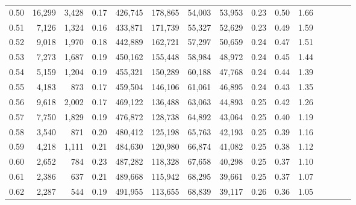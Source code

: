 \begin{tabular}{rrrcrrrrrrrrrrr}
0.50 &  16,299 &  3,428 &                                       0.17 &  426,745 &  178,865 &   54,003 &   53,953 &  0.23 &  0.50 &                         1.66 \\
0.51 &   7,126 &  1,324 &                                       0.16 &  433,871 &  171,739 &   55,327 &   52,629 &  0.23 &  0.49 &                         1.59 \\
0.52 &   9,018 &  1,970 &                                       0.18 &  442,889 &  162,721 &   57,297 &   50,659 &  0.24 &  0.47 &                         1.51 \\
0.53 &   7,273 &  1,687 &                                       0.19 &  450,162 &  155,448 &   58,984 &   48,972 &  0.24 &  0.45 &                         1.44 \\
0.54 &   5,159 &  1,204 &                                       0.19 &  455,321 &  150,289 &   60,188 &   47,768 &  0.24 &  0.44 &                         1.39 \\
0.55 &   4,183 &    873 &                                       0.17 &  459,504 &  146,106 &   61,061 &   46,895 &  0.24 &  0.43 &                         1.35 \\
0.56 &   9,618 &  2,002 &                                       0.17 &  469,122 &  136,488 &   63,063 &   44,893 &  0.25 &  0.42 &                         1.26 \\
0.57 &   7,750 &  1,829 &                                       0.19 &  476,872 &  128,738 &   64,892 &   43,064 &  0.25 &  0.40 &                         1.19 \\
0.58 &   3,540 &    871 &                                       0.20 &  480,412 &  125,198 &   65,763 &   42,193 &  0.25 &  0.39 &                         1.16 \\
0.59 &   4,218 &  1,111 &                                       0.21 &  484,630 &  120,980 &   66,874 &   41,082 &  0.25 &  0.38 &                         1.12 \\
0.60 &   2,652 &    784 &                                       0.23 &  487,282 &  118,328 &   67,658 &   40,298 &  0.25 &  0.37 &                         1.10 \\
0.61 &   2,386 &    637 &                                       0.21 &  489,668 &  115,942 &   68,295 &   39,661 &  0.25 &  0.37 &                         1.07 \\
0.62 &   2,287 &    544 &                                       0.19 &  491,955 &  113,655 &   68,839 &   39,117 &  0.26 &  0.36 &                         1.05 \\

\end{tabular}
